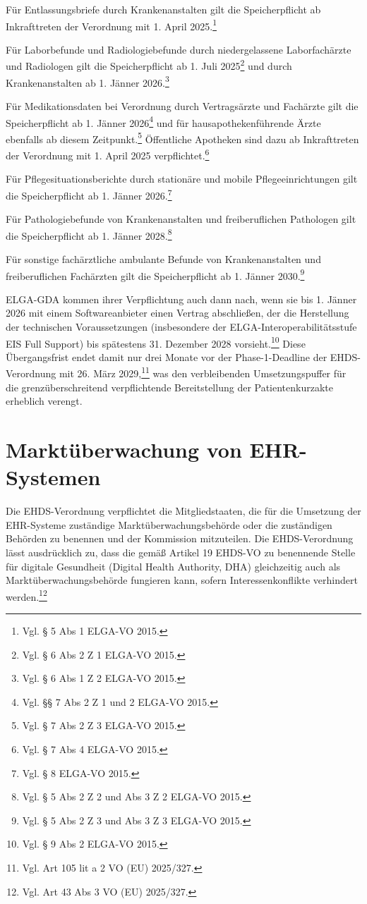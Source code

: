 Für Entlassungsbriefe durch Krankenanstalten gilt die Speicherpflicht ab Inkrafttreten der Verordnung mit 1. April 2025.\footnote{Vgl. § 5 Abs 1 ELGA-VO 2015.}

Für Laborbefunde und Radiologiebefunde durch niedergelassene Laborfachärzte und Radiologen  gilt die Speicherpflicht ab 1. Juli 2025\footnote{Vgl. § 6 Abs 2 Z 1 ELGA-VO 2015.} und durch Krankenanstalten ab 1. Jänner 2026.\footnote{Vgl. § 6 Abs 1 Z 2 ELGA-VO 2015.}

Für Medikationsdaten bei Verordnung durch Vertragsärzte und Fachärzte gilt die Speicherpflicht ab 1. Jänner 2026\footnote{Vgl. §§ 7 Abs 2 Z 1 und 2 ELGA-VO 2015.} und für hausapothekenführende Ärzte ebenfalls ab diesem Zeitpunkt.\footnote{Vgl. § 7 Abs 2 Z 3 ELGA-VO 2015.} Öffentliche Apotheken sind dazu ab Inkrafttreten der Verordnung mit 1. April 2025 verpflichtet.\footnote{Vgl. § 7 Abs 4 ELGA-VO 2015.}

Für Pflegesituationsberichte durch stationäre und mobile Pflegeeinrichtungen gilt die Speicherpflicht ab 1. Jänner 2026.\footnote{Vgl. § 8 ELGA-VO 2015.}

Für Pathologiebefunde von Krankenanstalten und freiberuflichen Pathologen gilt die Speicherpflicht ab 1. Jänner 2028.\footnote{Vgl. § 5 Abs 2 Z 2 und Abs 3 Z 2 ELGA-VO 2015.}

Für sonstige fachärztliche ambulante Befunde von Krankenanstalten und freiberuflichen Fachärzten gilt die Speicherpflicht ab 1. Jänner 2030.\footnote{Vgl. § 5 Abs 2 Z 3 und Abs 3 Z 3 ELGA-VO 2015.}

ELGA-GDA kommen ihrer Verpflichtung auch dann nach, wenn sie bis 1. Jänner 2026 mit einem Softwareanbieter einen Vertrag abschließen, der die Herstellung der technischen Voraussetzungen (insbesondere der ELGA-Interoperabilitätsstufe \glqq EIS Full Support\grqq) bis spätestens 31. Dezember 2028 vorsieht.\footnote{Vgl. § 9 Abs 2 ELGA-VO 2015.} Diese Übergangsfrist endet damit nur drei Monate vor der Phase-1-Deadline der EHDS-Verordnung mit 26. März 2029,\footnote{Vgl. Art 105 lit a 2 VO (EU) 2025/327.} was den verbleibenden Umsetzungspuffer für die grenzüberschreitend verpflichtende Bereitstellung der Patientenkurzakte erheblich verengt.

\section{Marktüberwachung von EHR-Systemen}

Die EHDS-Verordnung verpflichtet die Mitgliedstaaten, die für die Umsetzung der EHR-Systeme zuständige Marktüberwachungsbehörde oder die zuständigen Behörden zu benennen und der Kommission mitzuteilen. Die EHDS-Verordnung lässt ausdrücklich zu, dass die gemäß Artikel 19 EHDS-VO zu benennende Stelle für digitale Gesundheit (Digital Health Authority, DHA) gleichzeitig auch als Marktüberwachungsbehörde fungieren kann, sofern Interessenkonflikte verhindert werden.\footnote{Vgl. Art 43 Abs 3 VO (EU) 2025/327.}

